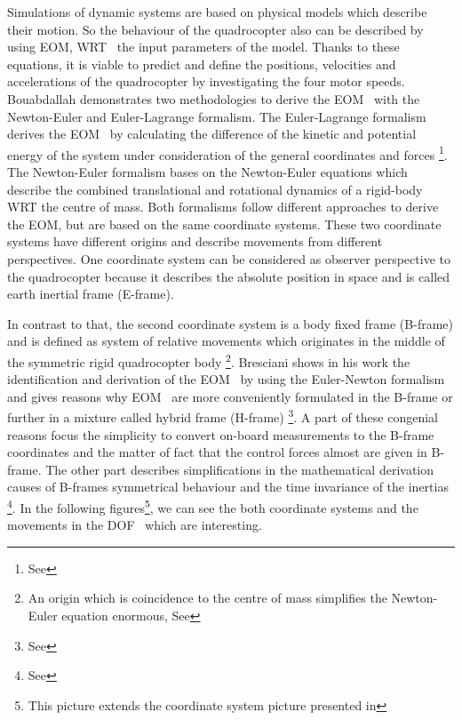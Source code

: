 Simulations of dynamic systems are based on physical models which describe their
motion. So the behaviour of the quadrocopter also can be described by using \gls{EOM},
\gls{WRT}~ the input parameters of the model. Thanks to these equations, it is viable
to predict and define the positions, velocities and accelerations of the
quadrocopter by investigating the four motor speeds. Bouabdallah 
 demonstrates two methodologies to
derive the \gls{EOM}~ with the Newton-Euler and Euler-Lagrange formalism.
\newpage 
The Euler-Lagrange formalism derives the \gls{EOM}~ by calculating the difference of the
kinetic and potential energy of the system under consideration of the general coordinates and forces 
\footnote{See }.
The Newton-Euler formalism bases on the Newton-Euler equations
 which
describe the combined translational and rotational dynamics of a rigid-body \gls{WRT} the centre of mass.
 Both formalisms follow different approaches to derive the \gls{EOM}, but are based
on the same coordinate systems. These two coordinate systems have different origins and describe
 movements from different perspectives. One coordinate system can be considered as observer perspective to
 the quadrocopter because it describes the absolute position in space and is
 called earth inertial frame (E-frame). 

In contrast to that, the second
 coordinate system is a body fixed frame (B-frame) and is defined as system of
 relative movements which originates in the middle of the symmetric rigid
 quadrocopter body
\footnote{An origin which is coincidence to the centre of mass simplifies the
 Newton-Euler equation enormous, See }. Bresciani  shows in his
work the identification and derivation of the \gls{EOM}~ by using the Euler-Newton
formalism and gives reasons why \gls{EOM}~ are more conveniently formulated in the
B-frame or further in a mixture called hybrid frame (H-frame) \footnote{See
 }. A part of these congenial reasons focus the
simplicity to convert on-board measurements to the B-frame coordinates and the
matter of fact that the control  forces almost are given in B-frame.
The other part describes simplifications in
 the mathematical derivation causes of B-frames symmetrical behaviour and the time
 invariance of the inertias
\footnote{See  }.
\newpage
In the following figures\footnote{This picture
extends the coordinate system picture presented in}, we can see the both coordinate systems and the movements in the
\gls{DOF}~ which are interesting.




